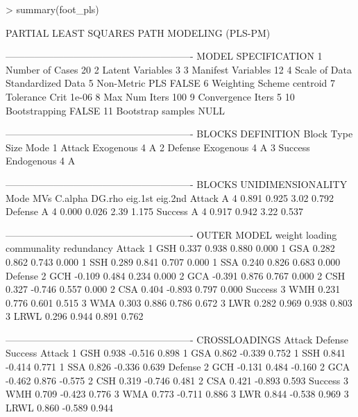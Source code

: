 \documentclass{paper}
\begin{document}
\begin{Schunk}
\begin{Sinput}
> summary(foot_pls)
\end{Sinput}
\begin{Soutput}
PARTIAL LEAST SQUARES PATH MODELING (PLS-PM) 

---------------------------------------------------------- 
MODEL SPECIFICATION 
1   Number of Cases      20 
2   Latent Variables     3 
3   Manifest Variables   12 
4   Scale of Data        Standardized Data 
5   Non-Metric PLS       FALSE 
6   Weighting Scheme     centroid 
7   Tolerance Crit       1e-06 
8   Max Num Iters        100 
9   Convergence Iters    5 
10  Bootstrapping        FALSE 
11  Bootstrap samples    NULL 

---------------------------------------------------------- 
BLOCKS DEFINITION 
      Block         Type   Size   Mode
1    Attack    Exogenous      4      A
2   Defense    Exogenous      4      A
3   Success   Endogenous      4      A

---------------------------------------------------------- 
BLOCKS UNIDIMENSIONALITY 
         Mode  MVs  C.alpha  DG.rho  eig.1st  eig.2nd
Attack      A    4    0.891   0.925     3.02    0.792
Defense     A    4    0.000   0.026     2.39    1.175
Success     A    4    0.917   0.942     3.22    0.537

---------------------------------------------------------- 
OUTER MODEL 
          weight  loading  communality  redundancy
Attack                                            
  1 GSH    0.337    0.938        0.880       0.000
  1 GSA    0.282    0.862        0.743       0.000
  1 SSH    0.289    0.841        0.707       0.000
  1 SSA    0.240    0.826        0.683       0.000
Defense                                           
  2 GCH   -0.109    0.484        0.234       0.000
  2 GCA   -0.391    0.876        0.767       0.000
  2 CSH    0.327   -0.746        0.557       0.000
  2 CSA    0.404   -0.893        0.797       0.000
Success                                           
  3 WMH    0.231    0.776        0.601       0.515
  3 WMA    0.303    0.886        0.786       0.672
  3 LWR    0.282    0.969        0.938       0.803
  3 LRWL   0.296    0.944        0.891       0.762

---------------------------------------------------------- 
CROSSLOADINGS 
          Attack  Defense  Success
Attack                            
  1 GSH    0.938   -0.516    0.898
  1 GSA    0.862   -0.339    0.752
  1 SSH    0.841   -0.414    0.771
  1 SSA    0.826   -0.336    0.639
Defense                           
  2 GCH   -0.131    0.484   -0.160
  2 GCA   -0.462    0.876   -0.575
  2 CSH    0.319   -0.746    0.481
  2 CSA    0.421   -0.893    0.593
Success                           
  3 WMH    0.709   -0.423    0.776
  3 WMA    0.773   -0.711    0.886
  3 LWR    0.844   -0.538    0.969
  3 LRWL   0.860   -0.589    0.944


\end{Soutput}
\end{Schunk}
\end{document}
